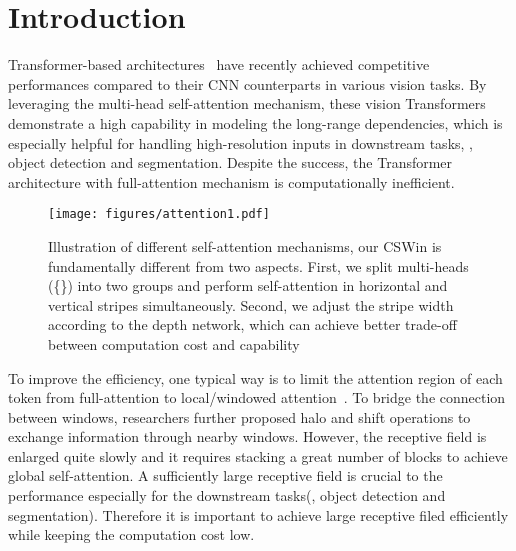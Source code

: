 \documentclass[10pt,twocolumn,letterpaper]{article}
\begin{document}
\section{Introduction}
Transformer-based architectures~\cite{dosovitskiy2020vit,touvron2020deit,liu2021swin,wu2021cvt} have recently achieved competitive performances compared to their CNN counterparts in various vision tasks. By leveraging the multi-head self-attention mechanism, these vision Transformers demonstrate a high capability in modeling the long-range dependencies, which is especially helpful for handling high-resolution inputs in downstream tasks, \eg, object detection and segmentation. Despite the success, the Transformer architecture with full-attention mechanism \cite{dosovitskiy2020vit}  is computationally inefficient. 


\begin{figure*}[t]
\centering
\texttt{[image: figures/attention1.pdf]} 
\vspace{-3mm}
\caption {Illustration of different self-attention mechanisms, our CSWin is fundamentally different from two aspects. First, we split multi-heads (\{\}) into two groups and perform self-attention in horizontal and vertical stripes simultaneously. Second, we adjust the stripe width according to the depth network, which can achieve better trade-off between computation cost and capability }


\label{fig:attn_com}
\vspace{-5mm}
\end{figure*}


To improve the efficiency, one typical way is to limit the attention region of each token from full-attention to local/windowed attention~\cite{liu2021swin, vaswani2021scaling}. To bridge the connection between windows, researchers further proposed halo and shift operations to exchange information through nearby windows. However, the receptive field is enlarged quite slowly and it requires stacking a great number of blocks to achieve global self-attention. A sufficiently large receptive field is crucial to the performance especially for the downstream tasks(\eg, object detection and segmentation). Therefore it is important to achieve large receptive filed efficiently while keeping the computation cost low.
\end{document}
